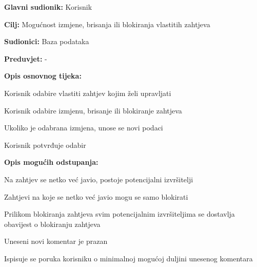 		
			\noindent {}
			\begin{packed_item}
				
				\item \textbf{Glavni sudionik: }Korisnik
				\item  \textbf{Cilj:} Mogućnost izmjene, brisanja ili blokiranja vlastitih zahtjeva
				\item  \textbf{Sudionici:} Baza podataka
				\item  \textbf{Preduvjet:} -
				\item  \textbf{Opis osnovnog tijeka:}
				
				\item[] \begin{packed_enum}
					
					\item Korisnik odabire vlastiti zahtjev kojim želi upravljati
					\item Korisnik odabire izmjenu, brisanje ili blokiranje zahtjeva
					\item Ukoliko je odabrana izmjena, unose se novi podaci 
					\item Korisnik potvrđuje odabir

				\end{packed_enum}
				
				\item  \textbf{Opis mogućih odstupanja:}
				
				\item[] \begin{packed_item}
					
					
					\item[2.a] Na zahtjev se netko već javio, postoje potencijalni izvršitelji
					\item[] \begin{packed_enum}
						
						\item Zahtjevi na koje se netko već javio mogu se samo blokirati
						\item Prilikom blokiranja zahtjeva svim potencijalnim izvršiteljima se dostavlja obavijest o blokiranju zahtjeva
						
					\end{packed_enum}
					\item[3.a] Uneseni novi komentar je prazan
					\item[] \begin{packed_enum}
						
						\item Ispisuje se poruka korisniku o minimalnoj mogućoj duljini unesenog komentara
						
					\end{packed_enum}
										
				\end{packed_item}
			\end{packed_item}
		
